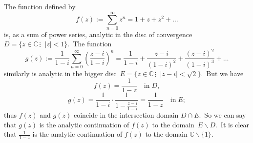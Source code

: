 \documentclass[12pt]{article}
\theoremstyle{definition}
\begin{document}
The function defined by
        $$f(z) := \sum_{n=0}^\infty z^n = 1+z+z^2+\ldots$$
is, as a sum of power series, analytic in the disc of convergence\, 
$D = \{z\in\mathbb{C}\,\vdots\;\; |z| < 1\}$.\, The function
   $$g(z) := \frac{1}{1-i}\sum_{n=0}^\infty\left(\frac{z-i}{1-i}\right)^n
= \frac{1}{1-i}+\frac{z-i}{(1-i)^2}+\frac{(z-i)^2}{(1-i)^3}+\ldots$$
similarly is analytic in the bigger disc\, 
$E = \{z\in\mathbb{C}\,\vdots\;\; |z-i| < \sqrt{2}\}$.\, But we have
$$f(z) = \frac{1}{1-z}\quad\mathrm{in}\; D,$$
$$g(z) = \frac{1}{1-i}\cdot\frac{1}{1-\frac{z-i}{1-i}} = \frac{1}{1-z}
\quad\mathrm{in}\; E;$$
thus $f(z)$ and $g(z)$ coincide in the intersection domain $D \cap E$.\, So we can say that $g(z)$ is the analytic continuation of $f(z)$ to the domain\, $E\!\smallsetminus\!D$.\, It is clear that $\frac{1}{1-z}$ is the analytic continuation of $f(z)$ to the domain $\mathbb{C}\!\smallsetminus\!\{1\}$.

\end{document}
